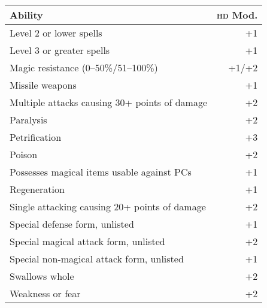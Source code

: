 \documentclass[10pt,letterpaper]{article}
\newcommand{\HD}[0]{{\scshape hd}}
\begin{document}
\begin{minipage}[t]{0.495\textwidth}
  \begin{tabularx}{\textwidth}{Xr}
    \toprule
    Ability & \HD{} Mod. \\
    \midrule
    Level 2 or lower spells & +1 \\
    Level 3 or greater spells & +1 \\
    Magic resistance (0--50\%/51--100\%) & +1/+2 \\
    Missile weapons & +1 \\
    Multiple attacks causing 30+ points of damage & +2 \\
    Paralysis & +2 \\
    Petrification & +3 \\
    Poison & +2 \\
    Possesses magical items usable against PCs & +1 \\
    Regeneration & +1 \\
    Single attacking causing 20+ points of damage & +2 \\
    Special defense form, unlisted & +1 \\
    Special magical attack form, unlisted & +2 \\
    Special non-magical attack form, unlisted & +1 \\
    Swallows whole & +2 \\
    Weakness or fear & +2 \\
    \bottomrule
  \end{tabularx}
\end{minipage}

\end{document}
